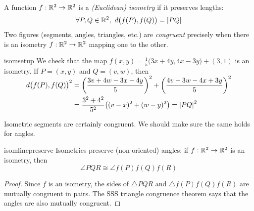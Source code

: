 \begin{defn}{}{}
	A function $f:\mathbb{R}^2\to\mathbb{R}^2$ is a \emph{(Euclidean) isometry} if it preserves lengths:\footnotemark
	\[
		\forall P,Q\in\R^2,\ d\bigl(f(P),f(Q)\bigr)=\nm{PQ}
	\]
	Two figures (segments, angles, triangles, etc.) are \emph{congruent} precisely when there is an isometry $f:\mathbb{R}^2\to\mathbb{R}^2$ mapping one to the other.
\end{defn}



\begin{example}{}{isomsetup}
	We check that the map $f(x,y)=\frac 15\bigl(3x+4y,4x-3y\bigr)+(3,1)$ is an isometry. If $P=(x,y)$ and $Q=(v,w)$, then
	\begin{align*}
		d\bigl(f(P),f(Q)\bigr)^2&=\smash[t]{\left(\frac{3v+4w-3x-4y}5\right)^2+\left(\frac{4v-3w-4x+3y}5\right)^2}\\
		&=\frac{3^2+4^2}{5^2}\bigl((v-x)^2+(w-y)^2\bigr) =\left| PQ\right|^2
	\end{align*}
\end{example}

Isometric segments are certainly congruent. We should make sure the same holds for angles.

\begin{lemm}{}{isomlinepreserve}
	Isometries preserve (non-oriented) angles: if $f:\mathbb{R}^2\to\mathbb{R}^2$ is an isometry, then
	\[
	  \angle PQR\cong \angle f(P)f(Q)f(R)
	\]
\end{lemm}

\begin{proof}
Since $f$ is an isometry, the sides of $\triangle PQR$ and $\triangle f(P)f(Q)f(R)$ are mutually congruent in pairs. The SSS triangle congruence theorem says that the angles are also mutually congruent.%
\end{proof}



